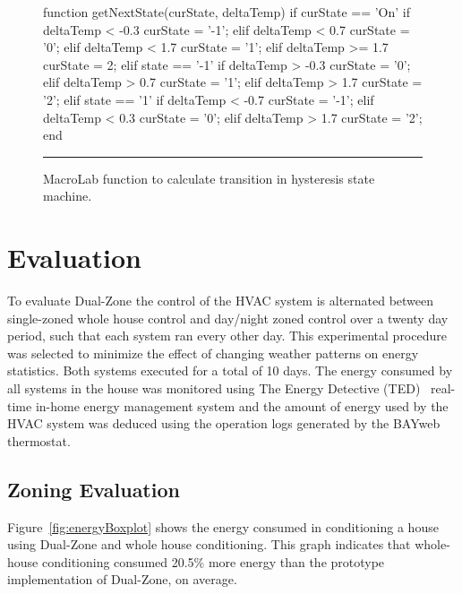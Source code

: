 \begin{figure}[!htb]
  \begin{macrolab}
function getNextState(curState, deltaTemp)
  if curState == 'On'
    if deltaTemp < -0.3
      curState = '-1'; %
    elif deltaTemp < 0.7
      curState = '0'; %
    elif deltaTemp < 1.7
      curState = '1'; %
    elif deltaTemp >= 1.7
      curState = 2; %
  elif state == '-1'
    if deltaTemp > -0.3
      curState = '0';
    elif deltaTemp > 0.7
      curState = '1';
    elif deltaTemp > 1.7
      curState = '2'; 
  elif state == '1'
    if deltaTemp < -0.7
      curState = '-1';
    elif deltaTemp < 0.3
      curState = '0';
    elif deltaTemp > 1.7
      curState = '2';
end
  \end{macrolab}
  \smallskip
  \hrule width 1\columnwidth
  \caption{MacroLab function to calculate transition in hysteresis state
  machine.}
  \label{code:getNextState}
\end{figure}

\section{Evaluation}
\label{sec:evaluation}

To evaluate Dual-Zone the control of the HVAC system is alternated between
single-zoned whole house control and day/night zoned control over a twenty day
period, such that each system ran every other day. This experimental procedure
was selected to minimize the effect of changing weather patterns on energy
statistics. Both systems executed for a total of 10 days. The energy consumed by
all systems in the house was monitored using The Energy Detective
(TED)~\cite{Energy} real-time in-home energy management system and the amount of
energy used by the HVAC system was deduced using the operation logs generated by
the BAYweb thermostat.


\subsection{Zoning Evaluation}

Figure~\ref{fig:energyBoxplot} shows the energy consumed in conditioning a house using
Dual-Zone and whole house conditioning. This graph indicates that whole-house
conditioning consumed 20.5\% more energy than the prototype implementation of
Dual-Zone, on average.

